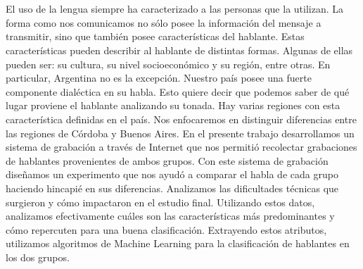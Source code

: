 \chapter*{\runtitulo}

\noindent 

El uso de la lengua siempre ha caracterizado a las personas que la utilizan. La forma como nos comunicamos no sólo posee la información del mensaje a transmitir, sino que también posee características del hablante. Estas características pueden describir al hablante de distintas formas. Algunas de ellas pueden ser: su cultura, su nivel socioeconómico y su región, entre otras. En particular, Argentina no es la excepción. Nuestro país posee una fuerte componente dialéctica en su habla. Esto quiere decir que podemos saber de qué lugar proviene el hablante analizando su tonada. Hay varias regiones con esta característica definidas en el país. Nos enfocaremos en distinguir diferencias entre las regiones de Córdoba y Buenos Aires. En el presente trabajo desarrollamos un sistema de grabación a través de Internet que nos permitió recolectar grabaciones de hablantes provenientes de ambos grupos. Con este sistema de grabación diseñamos un experimento que nos ayudó a comparar el habla de cada grupo haciendo hincapié en sus diferencias. Analizamos las dificultades técnicas que surgieron y cómo impactaron en el estudio final. Utilizando estos datos, analizamos efectivamente cuáles son las características más predominantes y cómo repercuten para una buena clasificación. Extrayendo estos atributos, utilizamos algoritmos de Machine Learning para la clasificación de hablantes en los dos grupos. 





